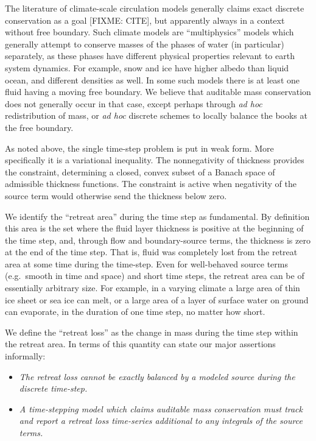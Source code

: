 \documentclass[final,leqno,onefignum,onetabnum]{siamltex1213bueler}
\begin{document}
The literature of climate-scale circulation models generally claims exact discrete conservation as a goal [FIXME: CITE], but apparently always in a context without free boundary.  Such climate models are ``multiphysics'' models which generally attempt to conserve masses of the phases of water (in particular) separately, as these phases have different physical properties relevant to earth system dynamics.  For example, snow and ice have higher albedo than liquid ocean, and different densities as well.  In some such models there is at least one fluid having a moving free boundary.  We believe that auditable mass conservation does not generally occur in that case, except perhaps through \emph{ad hoc} redistribution of mass, or \emph{ad hoc} discrete schemes to locally balance the books at the free boundary.

As noted above, the single time-step problem is put in weak form.  More specifically it is a variational inequality.  The nonnegativity of thickness provides the constraint, determining a closed, convex subset of a Banach space of admissible thickness functions.  The constraint is active when negativity of the source term would otherwise send the thickness below zero.

We identify the ``retreat area'' during the time step as fundamental.  By definition this area is the set where the fluid layer thickness is positive at the beginning of the time step, and, through flow and boundary-source terms, the thickness is zero at the end of the time step.  That is, fluid was completely lost from the retreat area at some time during the time-step.  Even for well-behaved source terms (e.g.~smooth in time and space) and short time steps, the retreat area can be of essentially arbitrary size.  For example, in a varying climate a large area of thin ice sheet or sea ice can melt, or a large area of a layer of surface water on ground can evaporate, in the duration of one time step, no matter how short.

We define the ``retreat loss'' as the change in mass during the time step within the retreat area.  In terms of this quantity can state our major assertions informally:\begin{itemize}
\item  \emph{The retreat loss cannot be \emph{exactly} balanced by a \emph{modeled} source during the discrete time-step.}
\item  \emph{A time-stepping model which claims auditable mass conservation must track and report a retreat loss time-series additional to any integrals of the source terms.}
\end{itemize}
\end{document}
